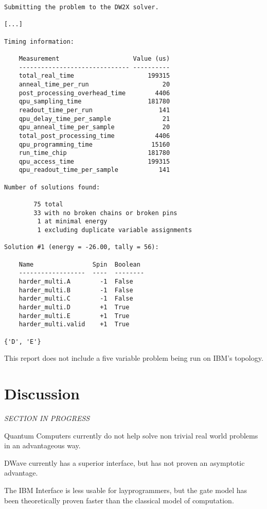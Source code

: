 \documentclass{article}
\begin{document}
\begin{verbatim}
Submitting the problem to the DW2X solver.

[...]

Timing information:

    Measurement                    Value (us)
    ------------------------------ ----------
    total_real_time                    199315
    anneal_time_per_run                    20
    post_processing_overhead_time        4406
    qpu_sampling_time                  181780
    readout_time_per_run                  141
    qpu_delay_time_per_sample              21
    qpu_anneal_time_per_sample             20
    total_post_processing_time           4406
    qpu_programming_time                15160
    run_time_chip                      181780
    qpu_access_time                    199315
    qpu_readout_time_per_sample           141

Number of solutions found:

        75 total
        33 with no broken chains or broken pins
         1 at minimal energy
         1 excluding duplicate variable assignments

Solution #1 (energy = -26.00, tally = 56):

    Name                Spin  Boolean
    ------------------  ----  --------
    harder_multi.A        -1  False  
    harder_multi.B        -1  False  
    harder_multi.C        -1  False  
    harder_multi.D        +1  True   
    harder_multi.E        +1  True   
    harder_multi.valid    +1  True    

{'D', 'E'}
\end{verbatim}

This report does not include a five variable problem being run on IBM's topology.

\section{Discussion}

\textit{SECTION IN PROGRESS}

Quantum Computers currently do not help solve non trivial real world problems in an advantageous way.

DWave currently has a superior interface, but has not proven an asymptotic advantage.

The IBM Interface is less usable for layprogrammers, but the gate model has been theoretically proven faster than the classical model of computation. 
\end{document}
